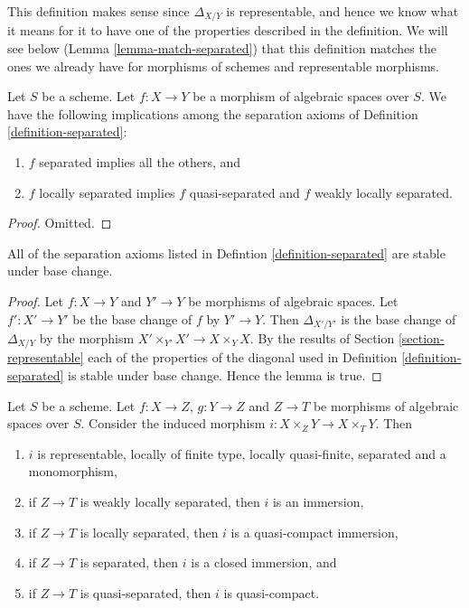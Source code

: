 \noindent
This definition makes sense since $\Delta_{X/Y}$ is representable,
and hence we know what it means for it to have one of the properties
described in the definition. We will see below
(Lemma \ref{lemma-match-separated}) that this definition matches the ones
we already have for morphisms of schemes and representable morphisms.

\begin{lemma}
\label{lemma-trivial-implications}
Let $S$ be a scheme.
Let $f : X \to Y$ be a morphism of algebraic spaces over $S$.
We have the following implications among the separation axioms
of Definition \ref{definition-separated}:
\begin{enumerate}
\item $f$ separated implies all the others, and
\item $f$ locally separated implies $f$ quasi-separated and
$f$ weakly locally separated.
\end{enumerate}
\end{lemma}

\begin{proof}
Omitted.
\end{proof}

\begin{lemma}
\label{lemma-base-change-separated}
All of the separation axioms listed in Defintion \ref{definition-separated}
are stable under base change.
\end{lemma}

\begin{proof}
Let $f : X \to Y$ and $Y' \to Y$ be morphisms of algebraic spaces.
Let $f' : X' \to Y'$ be the base change of $f$ by $Y' \to Y$. Then
$\Delta_{X'/Y'}$ is the base change of $\Delta_{X/Y}$ by
the morphism $X' \times_{Y'} X' \to X \times_Y X$. By the results of
Section \ref{section-representable}
each of the properties of the diagonal used in
Definition \ref{definition-separated}
is stable under base change. Hence the lemma is true.
\end{proof}

\begin{lemma}
\label{lemma-fibre-product-after-map}
Let $S$ be a scheme. Let $f : X \to Z$, $g : Y \to Z$ and $Z \to T$
be morphisms of algebraic spaces over $S$. Consider the induced morphism
$i : X \times_Z Y \to X \times_T Y$. Then
\begin{enumerate}
\item $i$ is representable, locally of finite type, locally quasi-finite,
separated and a monomorphism,
\item if $Z \to T$ is weakly locally separated, then $i$ is an immersion,
\item if $Z \to T$ is locally separated, then $i$ is a quasi-compact immersion,
\item if $Z \to T$ is separated, then $i$ is a closed immersion, and
\item if $Z \to T$ is quasi-separated, then $i$ is quasi-compact.
\end{enumerate}
\end{lemma}

